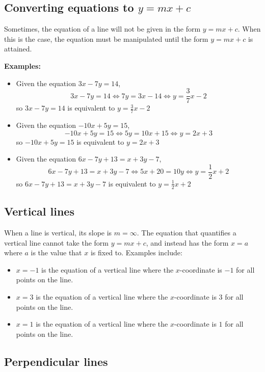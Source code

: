 \documentclass{article}
\begin{document}
\subsection*{Converting equations to $y = mx + c$}

Sometimes, the equation of a line will not be given in the form \(y = mx + c\). When this is the case, the equation must be manipulated until the form \(y = mx + c\) is attained. 

\textbf{Examples:}
\begin{itemize}
\item Given the equation \(3x - 7y = 14\), 
\[3x - 7y = 14 \iff 7y = 3x - 14 \iff y = \frac{3}{7}x - 2\]
so \(3x - 7y = 14\) is equivalent to \(y = \frac{3}{7}x - 2\)
\item Given the equation \(-10x + 5y = 15\),
\[-10x + 5y = 15 \iff 5y = 10x + 15 \iff y = 2x + 3\]
so \(-10x + 5y = 15\) is equivalent to \(y = 2x + 3\)
\item Given the equation \(6x - 7y + 13 = x + 3y - 7\), 
\[6x - 7y + 13 = x + 3y - 7 \iff 5x + 20 = 10y \iff y = \frac{1}{2}x + 2\] 
so \(6x - 7y + 13 = x + 3y - 7\) is equivalent to \(y = \frac{1}{2}x + 2\)
\end{itemize}




\subsection*{Vertical lines}

When a line is vertical, its slope is \(m = \infty\). The equation that quantifies a vertical line cannot take the form \(y = mx + c\), and instead has the form \(x = a\) where \(a\) is the value that \(x\) is fixed to. Examples include:
\begin{itemize}
\item \(x = -1\) is the equation of a vertical line where the \(x\)-coordinate is \(-1\) for all points on the line.
\item \(x = 3\) is the equation of a vertical line where the \(x\)-coordinate is \(3\) for all points on the line.
\item \(x = 1\) is the equation of a vertical line where the \(x\)-coordinate is \(1\) for all points on the line.
\end{itemize}



\subsection*{Perpendicular lines} 
\end{document}
